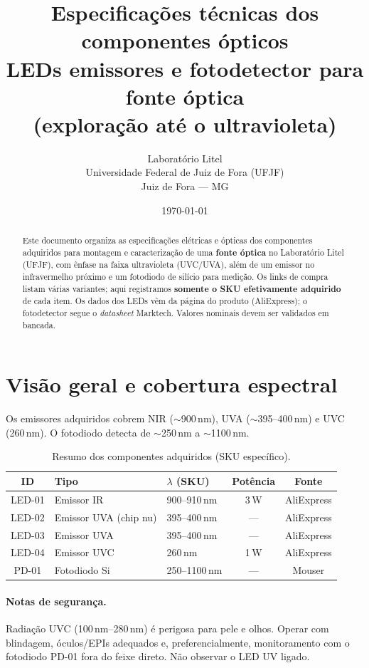 \documentclass[11pt,a4paper]{article}
\title{%
  Especificações técnicas dos componentes ópticos\\
  \large LEDs emissores e fotodetector para fonte óptica\\
  (exploração até o ultravioleta)}
\author{Laboratório Litel\\Universidade Federal de Juiz de Fora (UFJF)\\Juiz de Fora --- MG}
\date{\today}
\begin{document}
\maketitle

\begin{abstract}
Este documento organiza as especificações elétricas e ópticas dos componentes
adquiridos para montagem e caracterização de uma \textbf{fonte óptica} no
Laboratório Litel (UFJF), com ênfase na faixa ultravioleta (UVC/UVA), além de
um emissor no infravermelho próximo e um fotodiodo de silício para medição.
Os links de compra listam várias variantes; aqui registramos
\textbf{somente o SKU efetivamente adquirido} de cada item. Os dados dos LEDs
vêm da página do produto (AliExpress); o fotodetector segue o
\emph{datasheet} Marktech. Valores nominais devem ser validados em bancada.
\end{abstract}

\tableofcontents
\newpage

\section{Visão geral e cobertura espectral}

Os emissores adquiridos cobrem NIR ($\sim$900\,nm), UVA ($\sim$395--400\,nm)
e UVC (260\,nm). O fotodiodo detecta de $\sim$250\,nm a $\sim$1100\,nm.

\begin{table}[ht]
\centering
\caption{Resumo dos componentes adquiridos (SKU específico).}
\label{tab:resumo}
\begin{tabular}{@{}clp{3.8cm}cc@{}}
\toprule
ID & Tipo & $\lambda$ (SKU) & Potência & Fonte \\
\midrule
LED-01 & Emissor IR & 900--910\,nm & 3\,W & AliExpress \\
LED-02 & Emissor UVA (chip nu) & 395--400\,nm & --- & AliExpress \\
LED-03 & Emissor UVA & 395--400\,nm & --- & AliExpress \\
LED-04 & Emissor UVC & 260\,nm & 1\,W & AliExpress \\
PD-01 & Fotodiodo Si & 250--1100\,nm & --- & Mouser \\
\bottomrule
\end{tabular}
\end{table}

\paragraph{Notas de segurança.}
Radiação UVC (100\,nm--280\,nm) é perigosa para pele e olhos. Operar com
blindagem, óculos/EPIs adequados e, preferencialmente, monitoramento com o
fotodiodo PD-01 fora do feixe direto. Não observar o LED UV ligado.
\end{document}
